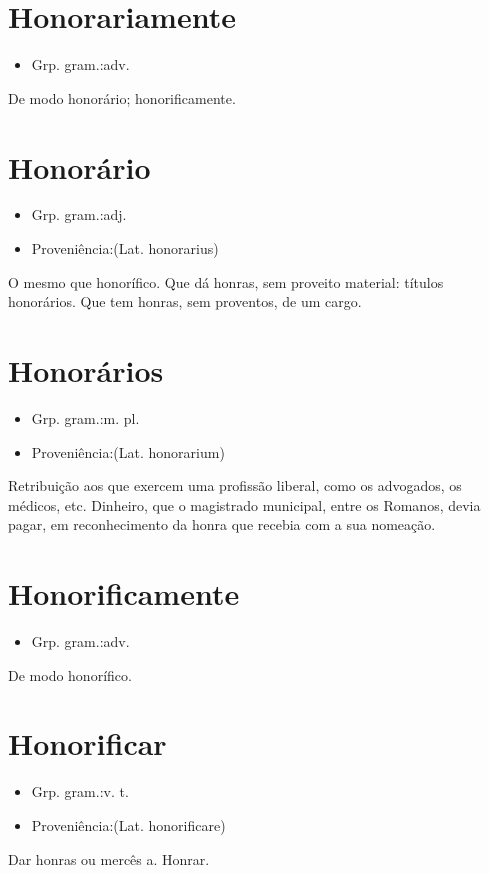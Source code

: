 \documentclass{article}
\begin{document}
\section{Honorariamente}
\begin{itemize}
\item {Grp. gram.:adv.}
\end{itemize}
De modo honorário; honorificamente.
\section{Honorário}
\begin{itemize}
\item {Grp. gram.:adj.}
\end{itemize}
\begin{itemize}
\item {Proveniência:(Lat. \textunderscore honorarius\textunderscore )}
\end{itemize}
O mesmo que \textunderscore honorífico\textunderscore .
Que dá honras, sem proveito material: \textunderscore títulos honorários\textunderscore .
Que tem honras, sem proventos, de um cargo.
\section{Honorários}
\begin{itemize}
\item {Grp. gram.:m. pl.}
\end{itemize}
\begin{itemize}
\item {Proveniência:(Lat. \textunderscore honorarium\textunderscore )}
\end{itemize}
Retribuição aos que exercem uma profissão liberal, como os advogados, os médicos, etc.
Dinheiro, que o magistrado municipal, entre os Romanos, devia pagar, em reconhecimento da honra que recebia com a sua nomeação.
\section{Honorificamente}
\begin{itemize}
\item {Grp. gram.:adv.}
\end{itemize}
De modo honorífico.
\section{Honorificar}
\begin{itemize}
\item {Grp. gram.:v. t.}
\end{itemize}
\begin{itemize}
\item {Proveniência:(Lat. \textunderscore honorificare\textunderscore )}
\end{itemize}
Dar honras ou mercês a.
Honrar.
\end{document}
